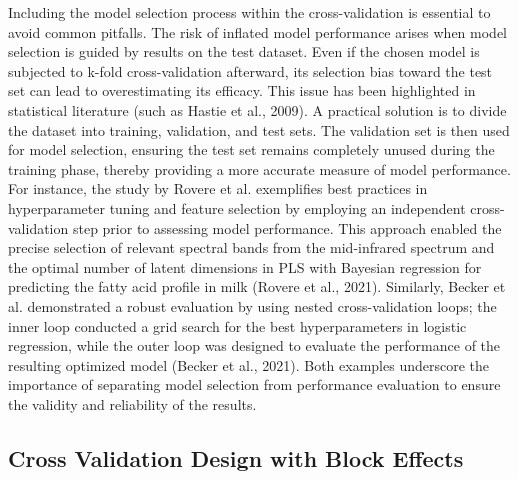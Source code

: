 Including the model selection process within the cross-validation is essential to avoid common pitfalls. The risk of inflated model performance arises when model selection is guided by results on the test dataset. Even if the chosen model is subjected to k-fold cross-validation afterward, its selection bias toward the test set can lead to overestimating its efficacy. This issue has been highlighted in statistical literature (such as Hastie et al., 2009). A practical solution is to divide the dataset into training, validation, and test sets. The validation set is then used for model selection, ensuring the test set remains completely unused during the training phase, thereby providing a more accurate measure of model performance. For instance, the study by Rovere et al. exemplifies best practices in hyperparameter tuning and feature selection by employing an independent cross-validation step prior to assessing model performance. This approach enabled the precise selection of relevant spectral bands from the mid-infrared spectrum and the optimal number of latent dimensions in PLS with Bayesian regression for predicting the fatty acid profile in milk (Rovere et al., 2021). Similarly, Becker et al. demonstrated a robust evaluation by using nested cross-validation loops; the inner loop conducted a grid search for the best hyperparameters in logistic regression, while the outer loop was designed to evaluate the performance of the resulting optimized model (Becker et al., 2021). Both examples underscore the importance of separating model selection from performance evaluation to ensure the validity and reliability of the results.

\subsection{Cross Validation Design with Block Effects}

